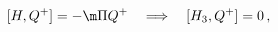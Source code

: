 \begin{equation}\label{q+}
[H,Q^+]=-\m\Pi Q^+\quad\Longrightarrow\quad[H_3,Q^+]=0\,,
\end{equation}

